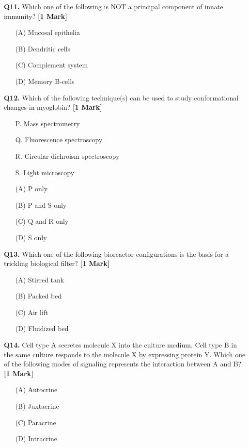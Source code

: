 \documentclass[11pt]{article}
\newcommand{\questiona}[2]{
    \noindent\textbf{Q#2.} #1 \hfill \textbf{[1 Mark]}
}
\begin{document}
\questiona{Which one of the following is NOT a principal component of innate immunity?}{11}
\begin{enumerate}
    \item[(A)] Mucosal epithelia  
    \item[(B)] Dendritic cells  
    \item[(C)] Complement system  
    \item[(D)] Memory B-cells  
\end{enumerate}
\vspace{0.5cm}

\questiona{Which of the following technique(s) can be used to study conformational changes in myoglobin?}{12}
\begin{enumerate}
    \item[P.] Mass spectrometry  
    \item[Q.] Fluorescence spectroscopy  
    \item[R.] Circular dichroism spectroscopy  
    \item[S.] Light microscopy  
    \item[(A)] P only  
    \item[(B)] P and S only  
    \item[(C)] Q and R only  
    \item[(D)] S only  
\end{enumerate}
\vspace{0.5cm}

\questiona{Which one of the following bioreactor configurations is the basis for a trickling biological filter?}{13}
\begin{enumerate}
    \item[(A)] Stirred tank  
    \item[(B)] Packed bed  
    \item[(C)] Air lift  
    \item[(D)] Fluidized bed  
\end{enumerate}
\vspace{0.5cm}

\questiona{Cell type A secretes molecule X into the culture medium. Cell type B in the same culture responds to the molecule X by expressing protein Y. Which one of the following modes of signaling represents the interaction between A and B?}{14}
\begin{enumerate}
    \item[(A)] Autocrine  
    \item[(B)] Juxtacrine  
    \item[(C)] Paracrine  
    \item[(D)] Intracrine  
\end{enumerate}
\vspace{0.5cm}
\end{document}
